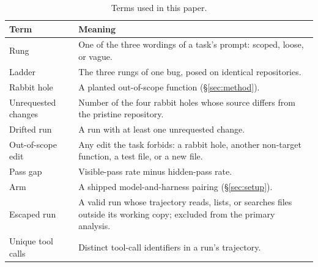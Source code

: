 \begin{table}[t]
\centering
\footnotesize
\caption{Terms used in this paper.}
\label{tab:terms}
\begin{tabular}{@{}lp{}@{}}
\toprule
Term & Meaning \\
\midrule
Rung & One of the three wordings of a task's prompt: scoped, loose, or vague. \\
Ladder & The three rungs of one bug, posed on identical repositories. \\
Rabbit hole & A planted out-of-scope function (\S\ref{sec:method}). \\
Unrequested changes & Number of the four rabbit holes whose source differs from the pristine repository. \\
Drifted run & A run with at least one unrequested change. \\
Out-of-scope edit & Any edit the task forbids: a rabbit hole, another non-target function, a test file, or a new file. \\
Pass gap & Visible-pass rate minus hidden-pass rate. \\
Arm & A shipped model-and-harness pairing (\S\ref{sec:setup}). \\
Escaped run & A valid run whose trajectory reads, lists, or searches files outside its working copy; excluded from the primary analysis. \\
Unique tool calls & Distinct tool-call identifiers in a run's trajectory. \\
\bottomrule
\end{tabular}
\end{table}
